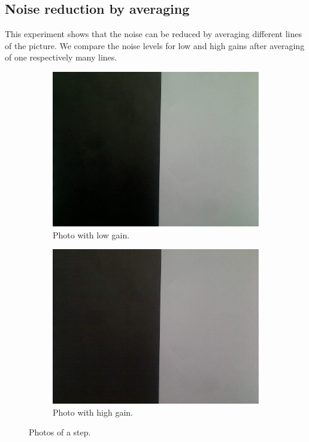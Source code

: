 \documentclass[a4paper, 12pt]{paper}
\begin{document}
\subsection{Noise reduction by averaging}
This experiment shows that the noise can be reduced by averaging different lines of the picture.
We compare the noise levels for low and high gains after averaging of one respectively many lines.

\begin{figure}[H]
    \centering
    \begin{subfigure}[b]{0.47\textwidth}
        \includegraphics[width=\textwidth]{img/contrast_no_gain.jpg}
        \caption{Photo with low gain.}
    \end{subfigure}
    \begin{subfigure}[b]{0.47\textwidth}
        \includegraphics[width=\textwidth]{img/contrast_max_gain.jpg}
        \caption{Photo with high gain.}
    \end{subfigure}
    \caption{Photos of a step.}
\label{fig:step}
\end{figure}
\end{document}
